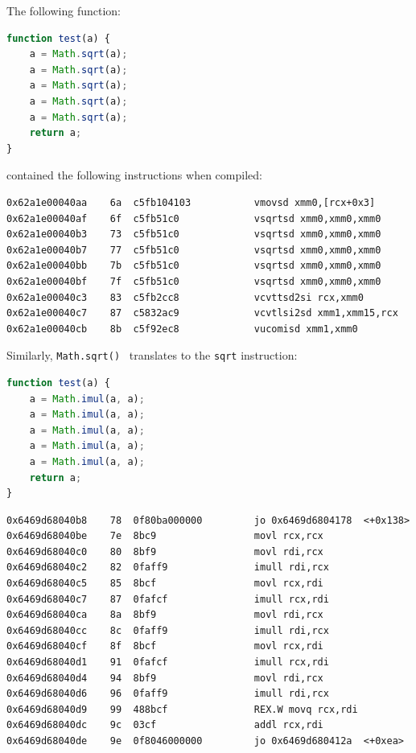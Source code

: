 \documentclass[11pt,
  titlepage=false,
]{scrreprt}
\begin{document}
The following function:
\begin{lstlisting}[language=JavaScript]
function test(a) {
    a = Math.sqrt(a);
    a = Math.sqrt(a);
    a = Math.sqrt(a);
    a = Math.sqrt(a);
    a = Math.sqrt(a);
    return a;
}
\end{lstlisting}
contained the following instructions when compiled:
\begin{lstlisting}
0x62a1e00040aa    6a  c5fb104103           vmovsd xmm0,[rcx+0x3]
0x62a1e00040af    6f  c5fb51c0             vsqrtsd xmm0,xmm0,xmm0
0x62a1e00040b3    73  c5fb51c0             vsqrtsd xmm0,xmm0,xmm0
0x62a1e00040b7    77  c5fb51c0             vsqrtsd xmm0,xmm0,xmm0
0x62a1e00040bb    7b  c5fb51c0             vsqrtsd xmm0,xmm0,xmm0
0x62a1e00040bf    7f  c5fb51c0             vsqrtsd xmm0,xmm0,xmm0
0x62a1e00040c3    83  c5fb2cc8             vcvttsd2si rcx,xmm0
0x62a1e00040c7    87  c5832ac9             vcvtlsi2sd xmm1,xmm15,rcx
0x62a1e00040cb    8b  c5f92ec8             vucomisd xmm1,xmm0
\end{lstlisting}

Similarly, \texttt{Math.sqrt()}~\cite{mathsqrt} translates to the \texttt{sqrt} instruction:
\begin{lstlisting}[language=JavaScript]
function test(a) {
    a = Math.imul(a, a);
    a = Math.imul(a, a);
    a = Math.imul(a, a);
    a = Math.imul(a, a);
    a = Math.imul(a, a);
    return a;
}
\end{lstlisting}
\begin{lstlisting}
0x6469d68040b8    78  0f80ba000000         jo 0x6469d6804178  <+0x138>
0x6469d68040be    7e  8bc9                 movl rcx,rcx
0x6469d68040c0    80  8bf9                 movl rdi,rcx
0x6469d68040c2    82  0faff9               imull rdi,rcx
0x6469d68040c5    85  8bcf                 movl rcx,rdi
0x6469d68040c7    87  0fafcf               imull rcx,rdi
0x6469d68040ca    8a  8bf9                 movl rdi,rcx
0x6469d68040cc    8c  0faff9               imull rdi,rcx
0x6469d68040cf    8f  8bcf                 movl rcx,rdi
0x6469d68040d1    91  0fafcf               imull rcx,rdi
0x6469d68040d4    94  8bf9                 movl rdi,rcx
0x6469d68040d6    96  0faff9               imull rdi,rcx
0x6469d68040d9    99  488bcf               REX.W movq rcx,rdi
0x6469d68040dc    9c  03cf                 addl rcx,rdi
0x6469d68040de    9e  0f8046000000         jo 0x6469d680412a  <+0xea>
\end{lstlisting}

\end{document}
